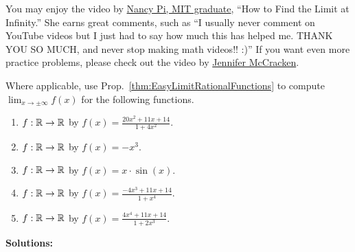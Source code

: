 \bigskip

You may enjoy the video by \href{https://youtu.be/nViVR1rImUE}{Nancy Pi, MIT graduate}, ``How to Find the Limit at Infinity.'' She earns great comments, such as ``I usually never comment on YouTube videos but I just had to say how much this has helped me. THANK YOU SO MUCH, and never stop making math videos!! :)'' If you want even more practice problems, please check out the video by \href{https://youtu.be/Tq0yImXNhc4}{Jennifer McCracken}.

\bigskip

\begin{example} 
\label{ex:EasyLimitsRationalFunction}
Where applicable, use Prop.~\ref{thm:EasyLimitRationalFunctions} to compute $\displaystyle \lim_{x \to \pm \infty} f(x)$ for the following functions. 

\begin{enumerate}
\renewcommand{\labelenumi}{(\alph{enumi})}
\setlength{\itemsep}{.2cm}
     \item  $f:\mathbb R \to \mathbb R$ by $f(x) = \frac{20 x^2 + 11 x + 14}{1 + 4x^2}$.
        \item   $f:\mathbb R \to \mathbb R$ by $f(x) = -x^3$.
    \item  $f:\mathbb R \to \mathbb R$ by $f(x) = x \cdot \sin(x)$.
    \item  $f:\mathbb R \to \mathbb R$ by $f(x) = \frac{-4x^3 + 11 x + 14}{1 + x^4}$.

        \item  $f:\mathbb R \to \mathbb R$ by $f(x) = \frac{4x^4 + 11 x + 14}{1 + 2x^3}$.
\end{enumerate} 
    
\end{example}

\textbf{Solutions:}


